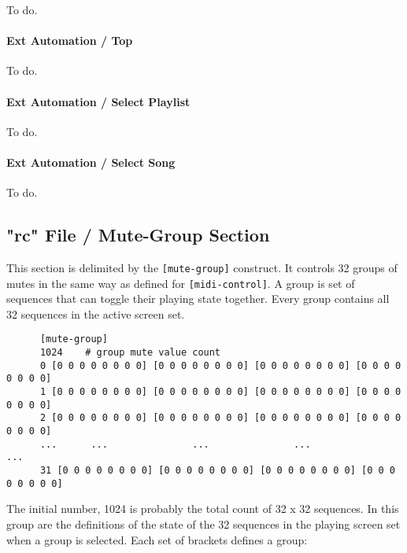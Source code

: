    To do.

\paragraph{Ext Automation / Top}
\label{paragraph:seq66_rc_file_midi_ctrl_ex_top}

   To do.

\paragraph{Ext Automation / Select Playlist}
\label{paragraph:seq66_rc_file_midi_ctrl_ex_sellist}

   To do.

\paragraph{Ext Automation / Select Song}
\label{paragraph:seq66_rc_file_midi_ctrl_ex_selsong}

   To do.

\subsection{"rc" File / Mute-Group Section}
\label{subsec:seq66_rc_file_mute_group}
     
   This section is delimited by the \texttt{[mute-group]} construct.
   It controls 32 groups of mutes in the same way as defined for
   \texttt{[midi-control]}. A group is set of sequences that can toggle their
   playing state together.  Every group contains all 32 sequences in the
   active screen set.

   \begin{verbatim}
      [mute-group]
      1024    # group mute value count
      0 [0 0 0 0 0 0 0 0] [0 0 0 0 0 0 0 0] [0 0 0 0 0 0 0 0] [0 0 0 0 0 0 0 0]
      1 [0 0 0 0 0 0 0 0] [0 0 0 0 0 0 0 0] [0 0 0 0 0 0 0 0] [0 0 0 0 0 0 0 0]
      2 [0 0 0 0 0 0 0 0] [0 0 0 0 0 0 0 0] [0 0 0 0 0 0 0 0] [0 0 0 0 0 0 0 0]
      ...      ...               ...               ...               ...
      31 [0 0 0 0 0 0 0 0] [0 0 0 0 0 0 0 0] [0 0 0 0 0 0 0 0] [0 0 0 0 0 0 0 0]
   \end{verbatim}

   The initial number, 1024 is probably the total count of 32 x 32 sequences.
   In this group are the definitions of the state of the 32 sequences
   in the playing screen set when a group is selected.
   Each set of brackets defines a group:
   
